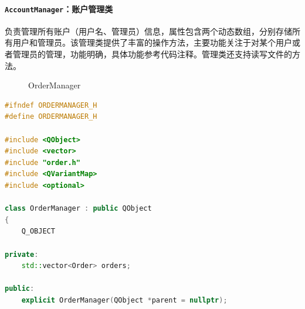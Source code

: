 \documentclass{article}
\begin{document}
				\paragraph{\texttt{AccountManager}：账户管理类} 负责管理所有账户（用户名、管理员）信息，属性包含两个动态数组，分别存储所有用户和管理员。该管理类提供了丰富的操作方法，主要功能关注于对某个用户或者管理员的管理，功能明确，具体功能参考代码注释。管理类还支持读写文件的方法。
				
				\begin{figure}[H]
					\centering
					
					\caption{OrderManager}
					\label{OrderManager}
				\end{figure}
				
				\begin{lstlisting}[language=C++, caption={OrderManager}]
#ifndef ORDERMANAGER_H
#define ORDERMANAGER_H

#include <QObject>
#include <vector>
#include "order.h"
#include <QVariantMap>
#include <optional>

class OrderManager : public QObject
{
    Q_OBJECT

private:
    std::vector<Order> orders;

public:
    explicit OrderManager(QObject *parent = nullptr);
    

\end{lstlisting}
\end{document}
